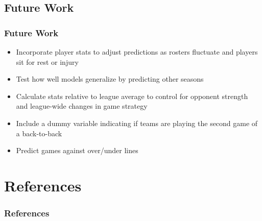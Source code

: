 \documentclass{beamer}
\begin{document}
\subsection{Future Work}
\begin{frame}[t]
\frametitle{Future Work}
\begin{itemize}
    \item Incorporate player stats to adjust predictions as rosters fluctuate and players sit for rest or injury
    \item Test how well models generalize by predicting other seasons
    \item Calculate stats relative to league average to control for opponent strength and league-wide changes in game strategy
    \item Include a dummy variable indicating if teams are playing the second game of a back-to-back
    \item Predict games against over/under lines
\end{itemize}
\end{frame}

\section{References}

\begin{frame}[t]
\frametitle{References}
\printbibliography
\end{frame}
\end{document}
